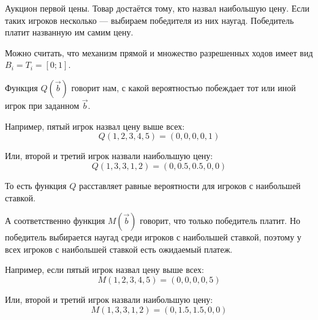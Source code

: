 \begin{myex} Аукцион первой цены. Товар достаётся тому, кто назвал наибольшую цену. Если таких игроков несколько — выбираем победителя из них наугад. Победитель платит названную им самим цену.

Можно считать, что механизм прямой и множество разрешенных ходов имеет вид $B_{i}=T_{i}=[0;1] $.

Функция $ Q(\vec{b}) $ говорит нам, с какой вероятностью побеждает тот или иной игрок при заданном $ \vec{b} $.

Например, пятый игрок назвал цену выше всех:
\begin{equation}
Q(1,2,3,4,5)=(0,0,0,0,1)
\end{equation}

Или, второй и третий игрок назвали наибольшую цену:
\begin{equation}
Q(1,3,3,1,2)=(0,0.5,0.5,0,0)
\end{equation}

То есть функция $ Q $ расставляет равные вероятности для игроков с наибольшей ставкой.

А соответственно функция $ M(\vec{b}) $ говорит, что только победитель платит. Но победитель выбирается наугад среди игроков с наибольшей ставкой, поэтому у всех игроков с наибольшей ставкой есть ожидаемый платеж.

Например, если пятый игрок назвал цену выше всех:
\begin{equation}
M(1,2,3,4,5)=(0,0,0,0,5)
\end{equation}

Или, второй и третий игрок назвали наибольшую цену:
\begin{equation}
M(1,3,3,1,2)=(0,1.5,1.5,0,0)
\end{equation}






\end{myex}

